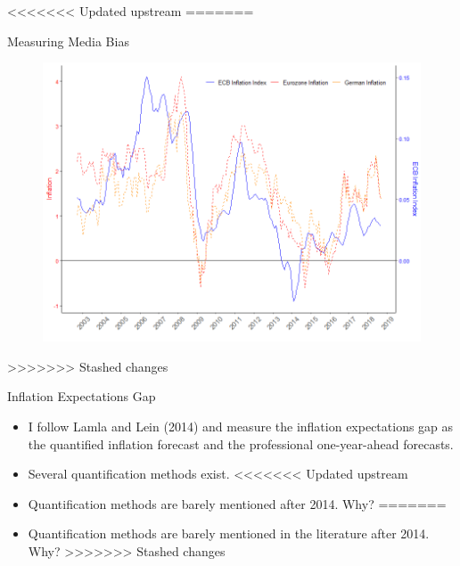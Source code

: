 \documentclass[aspectratio=169,xcolor=dvipsnames]{beamer}
\begin{document}

<<<<<<< Updated upstream
=======
\begin{frame}{Measuring Media Bias}

   \begin{figure}[!ht]
    \centering
    \includegraphics{ECB_inf_inf.png}
    \end{figure}

\end{frame}



>>>>>>> Stashed changes
\begin{frame}{Inflation Expectations Gap}

\begin{itemize}
\item I follow Lamla and Lein (2014) and measure the inflation expectations gap as the quantified inflation forecast and the professional one-year-ahead forecasts.
\item Several quantification methods exist. 
<<<<<<< Updated upstream
\item Quantification methods are barely mentioned after 2014. Why?
=======
\item Quantification methods are barely mentioned in the literature after 2014. Why?
>>>>>>> Stashed changes
\end{itemize}

\end{frame}

\end{document}
